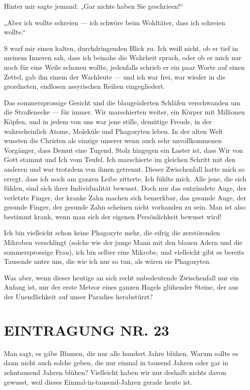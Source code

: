 Hinter mir sagte jemand: „Gar nichts haben Sie geschrieen!“

„Aber ich wollte schreien — ich schwöre beim Wohltäter, dass ich
schreien wollte.“

S warf mir einen kalten, durchdringenden Blick zu. Ich weiß nicht,
ob er tief in meinem Inneren sah, dass ich beinahe die Wahrheit
sprach, oder ob er mich nur noch für eine Weile schonen wollte,
jedenfalls schrieb er ein paar Worte auf einen Zettel, gab ihn
einem der Wachleute — und ich war frei, war wieder in die
geordneten, endlosen assyrischen Reihen eingegliedert.

Das sommersprossige Gesicht und die blaugeäderten Schläfen
verschwanden um die Straßenecke — für immer. Wir marschierten
weiter, ein Körper mit Millionen Köpfen, und in jedem von uns war
jene stille, demütige Freude, in der wahrscheinlich Atome, Moleküle
und Phagozyten leben. In der alten Welt wussten die Christen als
einzige unserer wenn auch sehr unvollkommenen Vorgänger, dass Demut
eine Tugend, Stolz hingegen ein Laster ist, dass Wir von Gott
stammt und Ich vom Teufel. Ich marschierte im gleichen Schritt mit
den anderen und war trotzdem von ihnen getrennt. Dieser
Zwischenfall hatte mich so erregt, dass ich noch am ganzen Leibe
zitterte. Ich fühlte mich. Alle jene, die sich fühlen, sind sich
ihrer Individualität bewusst. Doch nur das entzündete Auge, der
verletzte Finger, der kranke Zahn machen sich
bemerkbar, das gesunde Auge, der gesunde Finger, der gesunde Zahn
scheinen nicht vorhanden zu sein. Man ist also bestimmt krank, wenn
man sich der eigenen Persönlichkeit bewusst wird!

Ich bin vielleicht schon keine Phagozyte mehr, die eifrig die
zerstörenden Mikroben verschlingt (solche wie der junge Mann mit
den blauen Adern und die sommersprossige Frau), ich bin selber eine
Mikrobe, und vielleicht gibt es bereits Tausende unter uns, die wie
ich nur so tun, als wären sie Phagozyten.

Was aber, wenn dieser heutige an sich recht unbedeutende
Zwischenfall nur ein Anfang ist, nur der erste Meteor eines ganzen
Hagels glühender Steine, der aus der Unendlichkeit auf unser
Paradies herabstürzt?

\section{EINTRAGUNG NR. 23}

Man sagt, es gäbe Blumen, die nur alle hundert Jahre blühen. Warum
sollte es dann nicht auch solche geben, die nur einmal in tausend
Jahren oder gar in zehntausend Jahren blühen? Vielleicht haben wir
nur deshalb nichts davon gewusst, weil dieses
Einmal-in-tausend-Jahren gerade heute ist.

